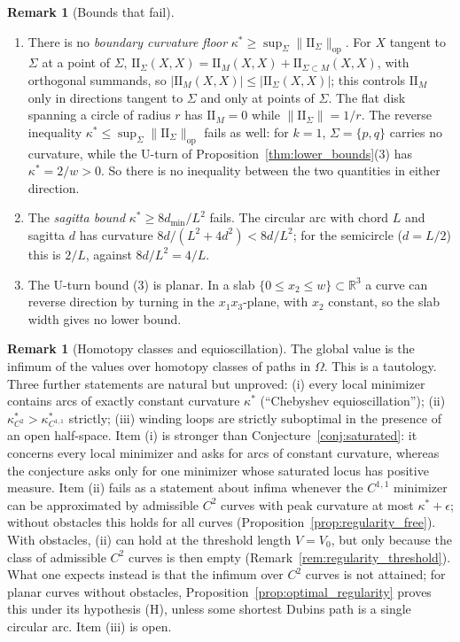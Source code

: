 \documentclass[11pt,reqno]{amsart}
\theoremstyle{definition}
\newtheorem{remark}[theorem]{Remark}
\providecommand{\R}{\mathbb{R}}
\providecommand{\II}{\mathrm{I\!I}}
\newcommand{\op}{\mathrm{op}}
\numberwithin{equation}{section}
\providecommand{\II}{\mathrm{II}}
\providecommand{\R}{\mathbb{R}}
\begin{document}
\begin{remark}[Bounds that fail]
\label{rem:slab}
\leavevmode
\begin{enumerate}
    \item[(a)] There is no \emph{boundary curvature floor} $\kappa^* \ge \sup_\Sigma \|\II_\Sigma\|_{\op}$. For $X$ tangent to $\Sigma$ at a point of $\Sigma$, $\II_\Sigma(X,X) = \II_M(X,X) + \II_{\Sigma \subset M}(X,X)$, with orthogonal summands, so $|\II_M(X,X)| \le |\II_\Sigma(X,X)|$; this controls $\II_M$ only in directions tangent to $\Sigma$ and only at points of $\Sigma$. The flat disk spanning a circle of radius $r$ has $\II_M = 0$ while $\|\II_\Sigma\| = 1/r$. The reverse inequality $\kappa^* \le \sup_\Sigma \|\II_\Sigma\|_{\op}$ fails as well: for $k = 1$, $\Sigma = \{p, q\}$ carries no curvature, while the U-turn of Proposition~\ref{thm:lower_bounds}(3) has $\kappa^* = 2/w > 0$. So there is no inequality between the two quantities in either direction.
    \item[(b)] The \emph{sagitta bound} $\kappa^* \ge 8d_{\min}/L^2$ fails. The circular arc with chord $L$ and sagitta $d$ has curvature $8d/(L^2 + 4d^2) < 8d/L^2$; for the semicircle ($d = L/2$) this is $2/L$, against $8d/L^2 = 4/L$.
    \item[(c)] The U-turn bound (3) is planar. In a slab $\{0 \le x_2 \le w\} \subset \R^3$ a curve can reverse direction by turning in the $x_1x_3$-plane, with $x_2$ constant, so the slab width gives no lower bound.
\end{enumerate}
\end{remark}

\begin{remark}[Homotopy classes and equioscillation]
The global value is the infimum of the values over homotopy classes of paths in $\Omega$. This is a tautology. Three further statements are natural but unproved: (i) every local minimizer contains arcs of exactly constant curvature $\kappa^*$ (``Chebyshev equioscillation''); (ii) $\kappa^*_{C^2} > \kappa^*_{C^{1,1}}$ strictly; (iii) winding loops are strictly suboptimal in the presence of an open half-space. Item (i) is stronger than Conjecture~\ref{conj:saturated}: it concerns every local minimizer and asks for arcs of constant curvature, whereas the conjecture asks only for one minimizer whose saturated locus has positive measure. Item (ii) fails as a statement about infima whenever the $C^{1,1}$ minimizer can be approximated by admissible $C^2$ curves with peak curvature at most $\kappa^* + \epsilon$; without obstacles this holds for all curves (Proposition~\ref{prop:regularity_free}). With obstacles, (ii) can hold at the threshold length $V = V_0$, but only because the class of admissible $C^2$ curves is then empty (Remark~\ref{rem:regularity_threshold}). What one expects instead is that the infimum over $C^2$ curves is not attained; for planar curves without obstacles, Proposition~\ref{prop:optimal_regularity} proves this under its hypothesis (H), unless some shortest Dubins path is a single circular arc. Item (iii) is open.
\end{remark}
\end{document}
